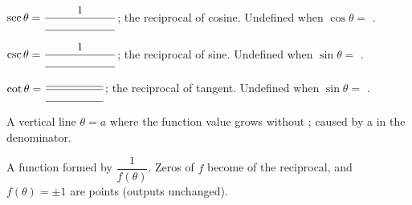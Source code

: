 \documentclass[10pt]{article}
\begin{document}
\begin{vocabbox}
\begin{description}[leftmargin=0pt, itemsep=6pt]
  \item[\termblanklong{secant}]
    $\sec\theta = \dfrac{1}{\underline{\hspace{2.2cm}}}$;
    the reciprocal of cosine.
    Undefined when $\cos\theta = $ \underline{\hspace{1cm}}.

  \item[\termblanklong{cosecant}]
    $\csc\theta = \dfrac{1}{\underline{\hspace{2.2cm}}}$;
    the reciprocal of sine.
    Undefined when $\sin\theta = $ \underline{\hspace{1cm}}.

  \item[\termblanklong{cotangent}]
    $\cot\theta = \dfrac{\underline{\hspace{1.8cm}}}{\underline{\hspace{1.8cm}}}$;
    the reciprocal of tangent.
    Undefined when $\sin\theta = $ \underline{\hspace{1cm}}.

  \item[\termblanklong{vertical asymptote}]
    A vertical line $\theta = a$ where the function value grows without
    \underline{\hspace{2.5cm}}; caused by a \underline{\hspace{1.5cm}} in the denominator.

  \item[\termblanklong{reciprocal function}]
    A function formed by $\dfrac{1}{f(\theta)}$.
    Zeros of $f$ become \underline{\hspace{2.5cm}} of the reciprocal,
    and $f(\theta) = \pm 1$ are \underline{\hspace{2cm}} points (outputs unchanged).
\end{description}
\end{vocabbox}

\vspace{0.08in}
\end{document}
